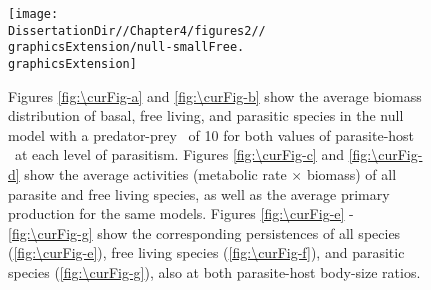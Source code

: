 \documentclass[/home/nkappler/Research/Dissertation/dissertation.tex]{subfiles}
\begin{document}
\begin{bibunit}
\begin{figure} 
    \texttt{[image: \\DissertationDir//Chapter4/figures2//\\graphicsExtension/null-smallFree.\\graphicsExtension]} 
    {%
    }%
    \caption[Dynamic results, Null model, Small free livers]{Figures \ref{fig:\curFig-a} and \ref{fig:\curFig-b} show 
        the average biomass distribution of basal, free living, and parasitic
        species in the null model with a predator-prey \aBSR~of 10 for both
        values of parasite-host \BSR~at each level of parasitism. Figures
        \ref{fig:\curFig-c} and \ref{fig:\curFig-d} show the average activities
        (metabolic rate $\times$ biomass) of all parasite and free living
        species, as well as the average primary production for the same models.
        Figures \ref{fig:\curFig-e} - \ref{fig:\curFig-g} show the
        corresponding persistences of all species (\ref{fig:\curFig-e}),
        free living species (\ref{fig:\curFig-f}), and parasitic species
        (\ref{fig:\curFig-g}), also at both parasite-host body-size
        ratios.\label{fig:null-smallFree}} 
\end{figure}




\edef\bigBioFracBioDecFree{\pgfmathresult}

\edef\smallBioFracBioDecFree{\pgfmathresult}

 \edef\bigBioPerDelPara{\pgfmathresult}

 \edef\smallBioPerDelPara{\pgfmathresult}


\end{bibunit}
\end{document}
